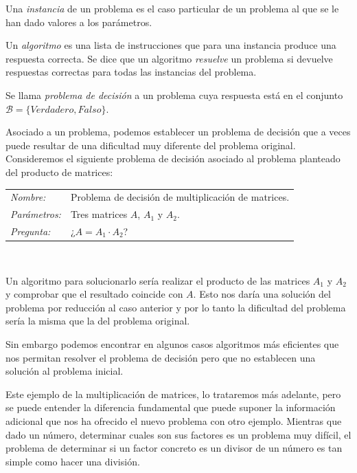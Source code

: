 \begin{definition}
	Una \textit{instancia} de un problema es el caso particular de un problema al que se le han dado valores a los parámetros.
\end{definition}


\begin{definition}
	Un \textit{algoritmo} es una lista de instrucciones que para una instancia produce una respuesta correcta. Se dice que un algoritmo \textit{resuelve} un problema si devuelve respuestas correctas para todas las instancias del problema.
\end{definition}


\begin{definition}
	Se llama \textit{problema de decisión} a un problema cuya respuesta está en el conjunto $\mathcal{B}= \{Verdadero, Falso\}$.
\end{definition}

Asociado a un problema, podemos establecer un problema de decisi\'on que a veces
puede resultar de una dificultad muy diferente del problema original. Consideremos el siguiente problema de decisi\'on asociado al problema planteado del producto de matrices:

\begin{example}

	\begin{tabular}{|ll}
		\textit{Nombre:} & Problema de decisi\'on de multiplicación de matrices. \\
		\textit{Parámetros:} & Tres matrices $A$, $A_1$ y $A_2$. \\
		\textit{Pregunta:} & ¿$ A = A_1 \cdot A_2$? \\
	\end{tabular}
	\\
	\hfil

	Un algoritmo para solucionarlo ser\'ia realizar el producto de las matrices $A_1$ y $A_2$ y comprobar que el resultado coincide con $A$. Esto nos dar\'ia una soluci\'on del problema por reducci\'on al caso anterior y por lo tanto la dificultad del problema ser\'ia la misma que la del problema original.

	Sin embargo podemos encontrar en algunos casos algoritmos m\'as eficientes que nos permitan resolver el problema de decisi\'on pero que no establecen una soluci\'on al problema inicial.
\end{example}

Este ejemplo de la multiplicaci\'on de matrices, lo trataremos m\'as adelante, pero se puede entender la diferencia fundamental que puede suponer la informaci\'on adicional que nos ha ofrecido el nuevo problema con otro ejemplo. Mientras que dado un n\'umero, determinar cuales son sus factores es un problema muy dif\'icil, el problema de determinar si un factor concreto es un divisor de un n\'umero es tan simple como hacer una divisi\'on.

